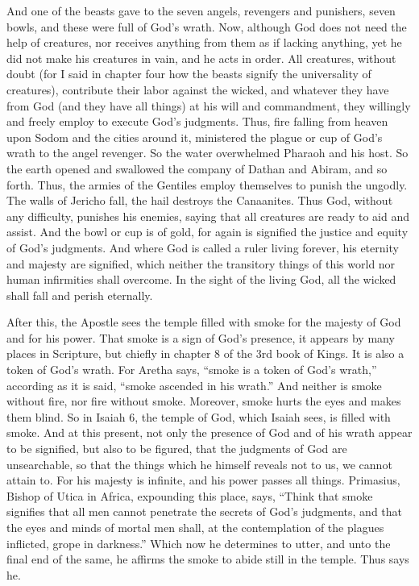 And one of the beasts gave to the seven angels, revengers and punishers, seven bowls, and these were full of God’s wrath. Now, although God does not need the help of creatures, nor receives anything from them as if lacking anything, yet he did not make his creatures in vain, and he acts in order. All creatures, without doubt (for I said in chapter four how the beasts signify the universality of creatures), contribute their labor against the wicked, and whatever they have from God (and they have all things) at his will and commandment, they willingly and freely employ to execute God’s judgments. Thus, fire falling from heaven upon Sodom and the cities around it, ministered the plague or cup of God’s wrath to the angel revenger. So the water overwhelmed Pharaoh and his host. So the earth opened and swallowed the company of Dathan and Abiram, and so forth. Thus, the armies of the Gentiles employ themselves to punish the ungodly. The walls of Jericho fall, the hail destroys the Canaanites. Thus God, without any difficulty, punishes his enemies, saying that all creatures are ready to aid and assist. And the bowl or cup is of gold, for again is signified the justice and equity of God’s judgments. And where God is called a ruler living forever, his eternity and majesty are signified, which neither the transitory things of this world nor human infirmities shall overcome. In the sight of the living God, all the wicked shall fall and perish eternally.

After this, the Apostle sees the temple filled with smoke for the majesty of God and for his power. That smoke is a sign of God’s presence, it appears by many places in Scripture, but chiefly in chapter 8 of the 3rd book of Kings. It is also a token of God’s wrath. For Aretha says, “smoke is a token of God’s wrath,” according as it is said, “smoke ascended in his wrath.” And neither is smoke without fire, nor fire without smoke. Moreover, smoke hurts the eyes and makes them blind. So in Isaiah 6, the temple of God, which Isaiah sees, is filled with smoke. And at this present, not only the presence of God and of his wrath appear to be signified, but also to be figured, that the judgments of God are unsearchable, so that the things which he himself reveals not to us, we cannot attain to. For his majesty is infinite, and his power passes all things. Primasius, Bishop of Utica in Africa, expounding this place, says, “Think that smoke signifies that all men cannot penetrate the secrets of God’s judgments, and that the eyes and minds of mortal men shall, at the contemplation of the plagues inflicted, grope in darkness.” Which now he determines to utter, and unto the final end of the same, he affirms the smoke to abide still in the temple. Thus says he.

